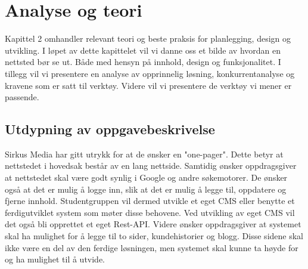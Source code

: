 \cleardoublepage
\chapter{Analyse og teori}
\label{chap:analysis}



Kapittel 2 omhandler relevant teori og beste praksis for planlegging, design og utvikling. I løpet av dette kapittelet vil vi danne oss et bilde av hvordan en nettsted bør se ut. Både med hensyn på innhold, design og funksjonalitet. I tillegg vil vi presentere en analyse av opprinnelig løsning, konkurrentanalyse og kravene som er satt til verktøy. Videre vil vi presentere de verktøy vi mener er passende.

\section{Utdypning av oppgavebeskrivelse}
Sirkus Media har gitt utrykk for at de ønsker en "one-pager". Dette betyr at nettstedet i hovedsak består av en lang nettside. Samtidig ønsker oppdragsgiver at nettstedet skal være godt synlig i Google og andre søkemotorer. De ønsker også at det er mulig å logge inn, slik at det er mulig å legge til, oppdatere og fjerne innhold. Studentgruppen vil dermed utvikle et eget CMS eller benytte et ferdigutviklet system som møter disse behovene. Ved utvikling av eget CMS vil det også bli opprettet et eget Rest-API. Videre ønsker oppdragsgiver at systemet skal ha mulighet for å legge til to sider, kundehistorier og blogg. Disse sidene skal ikke være en del av den ferdige løsningen, men systemet skal kunne ta høyde for og ha mulighet til å utvide.


